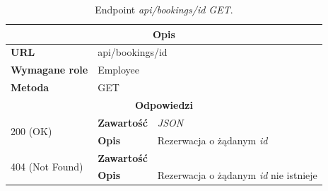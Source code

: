\documentclass[eng,printmode,openany]{mgr}
\begin{document}
\begin{table}[H]
	\caption{Endpoint \textit{api/bookings/id GET}.}
	\begin{tabularx}{\textwidth}{|l|l|X|}
		\hline
		\multicolumn{3}{|c|}{\textbf{\textbf{Opis}}}
		\\ \hline
		\textbf{URL}                         & \multicolumn{2}{l|}{api/bookings/id}
		\\ \hline
		\textbf{Wymagane role}               & \multicolumn{2}{l|}{Employee}
		\\ \hline
		\textbf{Metoda}                      & \multicolumn{2}{l|}{GET}
		\\ \hline
		\multicolumn{3}{|c|}{\textbf{Odpowiedzi}}
		\\ \hline
		\multirow{2}{*}{200 (OK)} 	        & \textbf{Zawartość}   	& \textit{JSON}
		\\ \cline{2-3}                      & \textbf{Opis}         	& Rezerwacja o żądanym \textit{id}
		\\ \hline
		\multirow{2}{*}{404 (Not Found)} 	& \textbf{Zawartość}     & 
		\\ \cline{2-3}                      & \textbf{Opis}          & Rezerwacja o żądanym \textit{id} nie istnieje
		\\ \hline
	\end{tabularx}
\end{table}
\end{document}

